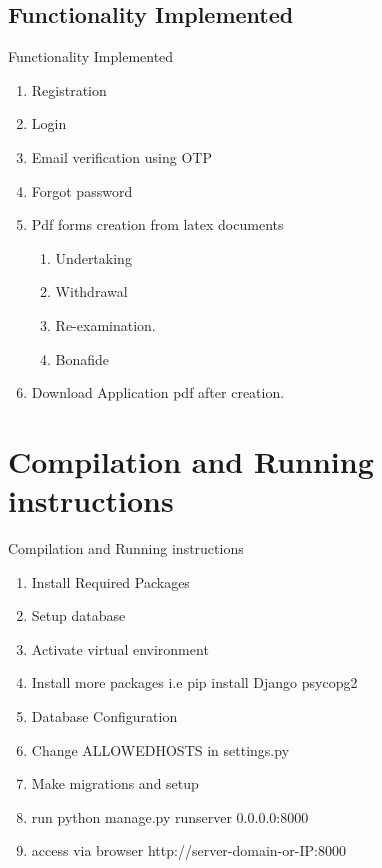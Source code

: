 \documentclass [] {beamer}
\begin{document}
\subsection{Functionality Implemented}
\begin{frame}{Functionality Implemented}
\begin{enumerate}
    \item Registration
    \item Login
    \item Email verification using OTP
    \item Forgot password
    \item Pdf forms creation from latex documents
    \begin{enumerate}
        \item Undertaking
        \item Withdrawal
        \item Re-examination.
        \item Bonafide

    \end{enumerate}
    \item Download Application pdf after creation.
\end{enumerate}







\end{frame}





\section{Compilation and Running instructions}
\begin{frame}{Compilation and Running instructions}

\begin{enumerate}
    \item Install Required Packages
    \item Setup database
    \item Activate virtual environment
    \item Install more packages i.e pip install Django psycopg2
    \item Database Configuration
    \item Change ALLOWEDHOSTS in settings.py
    \item Make migrations and setup
    \item run python manage.py runserver 0.0.0.0:8000
    \item access via browser http://server-domain-or-IP:8000
\end{enumerate}


\end{frame}


\begin{frame}
\end{frame}
\end{document}
